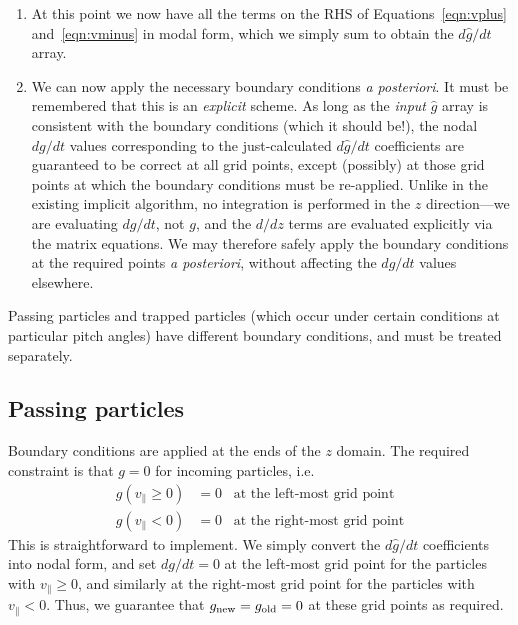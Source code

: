 \documentclass[10pt,a4paper]{article}
\begin{document}
\begin{enumerate}
\item At this point we now have all the terms on the RHS of
  Equations~\ref{eqn:vplus} and~\ref{eqn:vminus} in modal form, which we
  simply sum to obtain the $d\hat{g}/dt$ array.

\item We can now apply the necessary boundary conditions \textit{a
    posteriori}. It must be remembered that this is an \textit{explicit}\/
  scheme. As long as the \textit{input}\/ $\hat{g}$ array is consistent with
  the boundary conditions (which it should be!), the nodal $dg/dt$ values
  corresponding to the just-calculated $d\hat{g}/dt$ coefficients are
  guaranteed to be correct at all grid points, except (possibly) at those grid
  points at which the boundary conditions must be re-applied. Unlike in the
  existing implicit algorithm, no integration is performed in the $z$
  direction---we are evaluating $dg/dt$, not $g$, and the $d/dz$ terms are
  evaluated explicitly via the matrix equations. We may therefore safely apply
  the boundary conditions at the required points \textit{a posteriori},
  without affecting the $dg/dt$ values elsewhere.

\end{enumerate}

Passing particles and trapped particles (which occur under certain conditions
at particular pitch angles) have different boundary conditions, and must be
treated separately.

\subsection{Passing particles}

Boundary conditions are applied at the ends of the $z$ domain. The required
constraint is that $g = 0$ for incoming particles, i.e.
\begin{align*}
g(v_\parallel \geq 0) & = 0 \;\;\; \mbox{at the left-most grid point} \\
g(v_\parallel < 0) & = 0 \;\;\; \mbox{at the right-most grid point}
\end{align*}
This is straightforward to implement. We simply convert the $d\hat{g}/dt$
coefficients into nodal form, and set $dg/dt=0$ at the left-most grid point
for the particles with $v_\parallel \geq 0$, and similarly at the right-most
grid point for the particles with $v_\parallel < 0$. Thus, we guarantee that
$g_{\mbox{\scriptsize new}} = g_{\mbox{\scriptsize old}} = 0$ at these grid
points as required.
\end{document}
